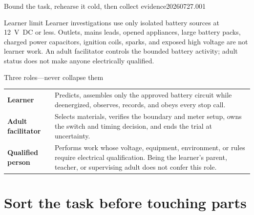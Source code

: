 


  {Bound the task, rehearse it cold, then collect evidence}{20260727.001}



\begin{teloshazard}{Learner limit}
Learner investigations use only isolated battery sources at \qty{12}{V DC} or
less. Outlets, mains leads, opened appliances, large battery packs, charged
power capacitors, ignition coils, sparks, and exposed high voltage are not
learner work. An adult facilitator controls the bounded battery activity; adult
status does not make anyone electrically qualified.
\end{teloshazard}

\begin{teloscard}{Three roles---never collapse them}
\begin{tabularx}{\linewidth}{@{}p{.18\linewidth}L@{}}
\textbf{Learner} & Predicts, assembles only the approved battery circuit while
deenergized, observes, records, and obeys every stop call.\\
\textbf{Adult facilitator} & Selects materials, verifies the boundary and meter
setup, owns the switch and timing decision, and ends the trial at uncertainty.\\
\textbf{Qualified person} & Performs work whose voltage, equipment, environment,
or rules require electrical qualification. Being the learner's parent, teacher,
or supervising adult does not confer this role.
\end{tabularx}
\end{teloscard}

\section{Sort the task before touching parts}

